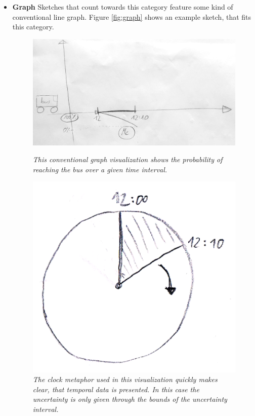 \begin{itemize}
	\item \textbf{Graph} Sketches that count towards this category feature some kind of conventional line graph. Figure \ref{fig:graph} shows an example sketch, that fits this category.
	
	\begin{figure}[H]
		\begin{minipage}{.5\textwidth}
			\centering
			\captionsetup{width=0.8\textwidth}
			\includegraphics[height=0.5\textwidth]{figures/graph.jpg}
			\caption{\textit{This conventional graph visualization shows the probability of reaching the bus over a given time interval.}}
			\label{fig:graph}
		\end{minipage}
		\begin{minipage}{.45\textwidth}
			\centering
			\captionsetup{width=1.0\textwidth}
			\includegraphics[height=0.5\textwidth]{figures/clock.png}
			\caption{\textit{The clock metaphor used in this visualization quickly makes clear, that temporal data is presented. In this case the uncertainty is only given through the bounds of the uncertainty interval.}}
			\label{fig:clock}
		\end{minipage}
	\end{figure}
	

\end{itemize}
